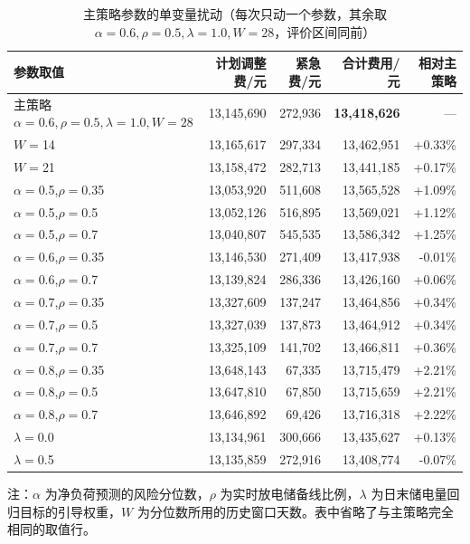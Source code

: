 \begin{table}[htbp]
  \centering
  \caption{主策略参数的单变量扰动（每次只动一个参数，其余取 $\alpha=0.6,\rho=0.5,\lambda=1.0,W=28$，评价区间同前）}
  \label{tab:p3-param}
  \small
  \begin{tabular}{lrrrr}
    \toprule
    参数取值 & 计划调整费/元 & 紧急费/元 & 合计费用/元 & 相对主策略 \\
    \midrule
    主策略 $\alpha=0.6,\rho=0.5,\lambda=1.0,W=28$ & 13,145,690 & 272,936 & \textbf{13,418,626} & --- \\
    \midrule
    $W=$14 & 13,165,617 & 297,334 & 13,462,951 & +0.33\% \\
    $W=$21 & 13,158,472 & 282,713 & 13,441,185 & +0.17\% \\
    $\alpha=$0.5,\;$\rho=$0.35 & 13,053,920 & 511,608 & 13,565,528 & +1.09\% \\
    $\alpha=$0.5,\;$\rho=$0.5 & 13,052,126 & 516,895 & 13,569,021 & +1.12\% \\
    $\alpha=$0.5,\;$\rho=$0.7 & 13,040,807 & 545,535 & 13,586,342 & +1.25\% \\
    $\alpha=$0.6,\;$\rho=$0.35 & 13,146,530 & 271,409 & 13,417,938 & -0.01\% \\
    $\alpha=$0.6,\;$\rho=$0.7 & 13,139,824 & 286,336 & 13,426,160 & +0.06\% \\
    $\alpha=$0.7,\;$\rho=$0.35 & 13,327,609 & 137,247 & 13,464,856 & +0.34\% \\
    $\alpha=$0.7,\;$\rho=$0.5 & 13,327,039 & 137,873 & 13,464,912 & +0.34\% \\
    $\alpha=$0.7,\;$\rho=$0.7 & 13,325,109 & 141,702 & 13,466,811 & +0.36\% \\
    $\alpha=$0.8,\;$\rho=$0.35 & 13,648,143 & 67,335 & 13,715,479 & +2.21\% \\
    $\alpha=$0.8,\;$\rho=$0.5 & 13,647,810 & 67,850 & 13,715,659 & +2.21\% \\
    $\alpha=$0.8,\;$\rho=$0.7 & 13,646,892 & 69,426 & 13,716,318 & +2.22\% \\
    $\lambda=$0.0 & 13,134,961 & 300,666 & 13,435,627 & +0.13\% \\
    $\lambda=$0.5 & 13,135,859 & 272,916 & 13,408,774 & -0.07\% \\
    \bottomrule
  \end{tabular}
  \par\vspace{2pt}
  \begin{minipage}{\textwidth}\footnotesize
    注：$\alpha$ 为净负荷预测的风险分位数，$\rho$ 为实时放电储备线比例，$\lambda$ 为日末储电量回归目标的引导权重，$W$ 为分位数所用的历史窗口天数。表中省略了与主策略完全相同的取值行。
  \end{minipage}
\end{table}

